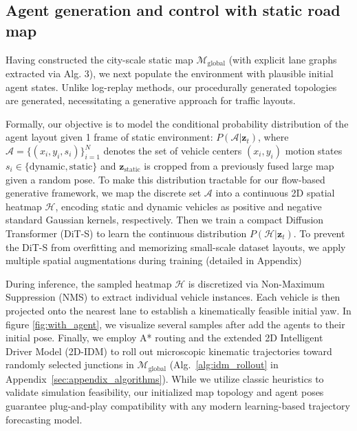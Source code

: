 \subsection{Agent generation and control with static road map}
\label{sec:agent}

Having constructed the city-scale static map $\mathcal{M}_{\text{global}}$ (with explicit lane graphs extracted via Alg. 3), we next populate the environment with plausible initial agent states. Unlike log-replay methods, our procedurally generated topologies are generated, necessitating a generative approach for traffic layouts.

Formally, our objective is to model the conditional probability distribution of the agent layout given 1 frame of static environment: $P(\mathcal{A} | \mathbf{z}_{t})$, where $\mathcal{A} = \{(x_i, y_i, s_i)\}_{i=1}^N$ denotes the set of vehicle centers $(x_i, y_i)$ motion states $s_i \in \{\text{dynamic}, \text{static}\}$ and $\mathbf{z}_{\text{static}}$ is cropped from a previously fused large map given a random pose. To make this distribution tractable for our flow-based generative framework, we map the discrete set $\mathcal{A}$ into a continuous 2D spatial heatmap $\mathcal{H}$, encoding static and dynamic vehicles as positive and negative standard Gaussian kernels, respectively. Then we train a compact Diffusion Transformer (DiT-S) to learn the continuous distribution $P(\mathcal{H} | \mathbf{z}_{t})$. To prevent the DiT-S from overfitting and memorizing small-scale dataset layouts, we apply multiple spatial augmentations during training (detailed in Appendix)

During inference, the sampled heatmap $\mathcal{H}$ is discretized via Non-Maximum Suppression (NMS) to extract individual vehicle instances. Each vehicle is then projected onto the nearest lane to establish a kinematically feasible initial yaw. In figure \ref{fig:with_agent}, we visualize several samples after add the agents to their initial pose. Finally, we employ A* routing and the extended 2D Intelligent Driver Model (2D-IDM) \cite{kesting2010enhanced} to roll out microscopic kinematic trajectories toward randomly selected junctions in $\mathcal{M}_{\text{global}}$ (Alg.~\ref{alg:idm_rollout} in Appendix~\ref{sec:appendix_algorithms}). While we utilize classic heuristics to validate simulation feasibility, our  initialized map topology and agent poses guarantee plug-and-play compatibility with any modern learning-based trajectory forecasting model.

